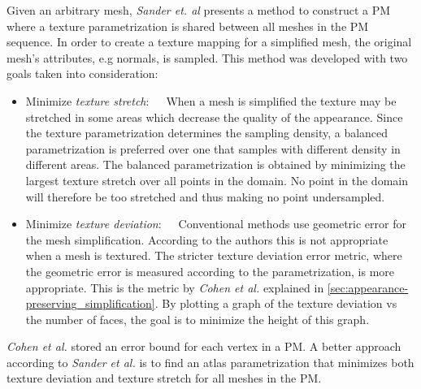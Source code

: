 Given an arbitrary mesh, \emph{Sander et. al} \cite{sander2001texture} presents a method to construct a PM where a texture parametrization is shared between all meshes in the PM sequence. In order to create a texture mapping for a simplified mesh, the original mesh's attributes, e.g normals, is sampled. This method was developed with two goals taken into consideration:
\begin{itemize}
\item{Minimize \emph{texture stretch}:}~~~When a mesh is simplified the texture may be stretched in some areas which decrease the quality of the appearance. Since the texture parametrization determines the sampling density, a balanced parametrization is preferred over one that samples with different density in different areas. The balanced parametrization is obtained by minimizing the largest texture stretch over all points in the domain. No point in the domain will therefore be too stretched and thus making no point undersampled. 
\item{Minimize \emph{texture deviation}:}~~~Conventional methods use geometric error for the mesh simplification. According to the authors this is not appropriate when a mesh is textured. The stricter texture deviation error metric, where the geometric error is measured according to the parametrization, is more appropriate. This is the metric by \emph{Cohen et al.} \cite{cohen1998appearance} explained in \cref{sec:appearance-preserving_simplification}. By plotting a graph of the texture deviation vs the number of faces, the goal is to minimize the height of this graph.
\end{itemize}

\emph{Cohen et al.} \cite{cohen1998appearance} stored an error bound for each vertex in a PM. A better approach according to \emph{Sander et al.} \cite{sander2001texture} is to find an atlas parametrization that minimizes both texture deviation and texture stretch for all meshes in the PM.

